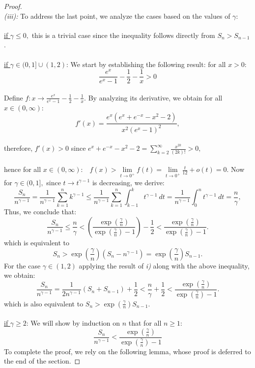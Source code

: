 \documentclass[11pt]{amsart}
\newcommand{\1}{[1]}
\begin{document}
\begin{proof}
\phantom{.} \\
\textit{(iii):}
 To address the last point, we analyze the cases based on the values of $\gamma:$ \\  \\
\underline{if $\gamma \leq 0,$} this is a trivial case since the inequality follows directly from \( S_{n} > S_{n-1} \). \\ \\ 
\underline{if $\gamma \in (0,1]\cup (1,2)$}: We start by establishing the following result: for all $x>0:$
$$ \frac{e^{x}}{e^{x}-1} - \frac{1}{2} - \frac{1}{x} > 0 $$
\phantom{.} \\
Define $\displaystyle f:x \to \frac{e^x}{e^x-1} - \frac{1}{2} - \frac{1}{x}.$ By analyzing its derivative, we obtain for all $x\in (0,\infty):$
$$ f'(x)= \frac{e^{x} (e^{x}+e^{-x}-x^2-2)}{x^2 (e^{x} -1)^2  }, $$ 
\phantom{.} \\ 
therefore, $f'(x)>0$ since $e^{x} + e^{-x} - x^2 - 2 = \displaystyle \sum_{k=2}^{\infty} \frac{x^{2k}}{(2k)!}> 0,$ \\ \\
hence for all $x\in (0,\infty):$ \ 
$\displaystyle f(x) > \lim\limits_{t\to 0^{+}} f(t) = \lim\limits_{t\to 0^{+}} \frac{t}{12} + o(t) = 0.$ Now for $\gamma \in (0,1],$ since $t\to t^{\gamma-1}$  is decreasing, we derive:
$$ \frac{S_n}{n^{\gamma-1}} = \frac{1}{n^{\gamma-1}}  \sum_{k=1}^{n} k^{\gamma-1} \leq  \frac{1}{n^{\gamma-1}}  \sum_{k=1}^{n} \int_{k-1}^{k} t^{\gamma-1} \ dt =  \frac{1}{n^{\gamma-1}} \int_{0}^{n} t^{\gamma-1} \ dt = \frac{n}{\gamma},
$$
Thus, we conclude that:
$$
\frac{S_n}{n^{\gamma-1}} \leq  \frac{n}{\gamma} < \left(\frac{\exp(\frac{\gamma}{n})}{\exp(\frac{\gamma}{n})-1}\right) -\frac{1}{2} < \frac{\exp(\frac{\gamma}{n})}{\exp(\frac{\gamma}{n})-1}.$$
which is equivalent to
$$ S_{n} > \exp(\frac{\gamma}{n})(S_{n}-n^{\gamma-1}) = \exp(\frac{\gamma}{n}) S_{n-1}.$$
For the case $\gamma \in (1,2)$ applying the result of \textit{ i)} along with the above inequality, we obtain:
$$ \frac{S_n}{n^{\gamma-1}} = \frac{1}{2 n^{\gamma-1}} (S_{n}+S_{n-1}) +\frac{1}{2} < \frac{n}{\gamma} + \frac{1}{2} < \frac{\exp(\frac{\gamma}{n})}{\exp(\frac{\gamma}{n})-1}.
$$
which is also equivalent to $S_{n} > \exp(\frac{\gamma}{n}) S_{n-1}.$ \\ \\
\underline{if $\gamma \geq 2$}: 
We will show by induction on \( n \) that for all $n \geq 1:$
$$ \frac{S_n}{n^{\gamma-1}} < \frac{\exp(\frac{\gamma}{n})}{\exp(\frac{\gamma}{n})-1}
$$
To complete the proof, we rely on the following lemma, whose proof is deferred to the end of the section.

\end{proof}
\end{document}
